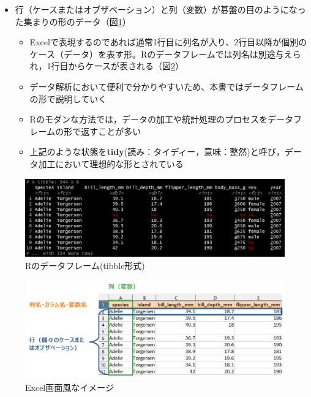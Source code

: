 \documentclass[
  xelatex,ja=standard, b5paper]{bxjsbook}
\providecommand{\tightlist}{%
  \setlength{\itemsep}{0pt}\setlength{\parskip}{0pt}}
\begin{document}
\begin{itemize}
\tightlist
\item
  行（ケースまたはオブザベーション）と列（変数）が碁盤の目のようになった集まりの形のデータ（図\ref{fig:dfr}）

  \begin{itemize}
  \tightlist
  \item
    Excelで表現するのであれば通常1行目に列名が入り、2行目以降が個別のケース（データ）を表す形。Rのデータフレームでは列名は別途与えられ，1行目からケースが表される（図\ref{fig:dfxl}）
  \item
    データ解析において便利で分かりやすいため、本書ではデータフレームの形で説明していく
  \item
    Rのモダンな方法では，データの加工や統計処理のプロセスをデータフレームの形で返すことが多い
  \item
    上記のような状態を\textbf{tidy}(読み：タイディー，意味：整然)と呼び，データ加工において理想的な形とされている
  \end{itemize}
\end{itemize}

\begin{figure}

{\centering \includegraphics[width=0.8\linewidth]{images/dfr} 

}

\caption{Rのデータフレーム(tibble形式)}\label{fig:dfr}
\end{figure}

\begin{figure}

{\centering \includegraphics[width=0.8\linewidth]{images/df_xl} 

}

\caption{Excel画面風なイメージ}\label{fig:dfxl}
\end{figure}
\end{document}
